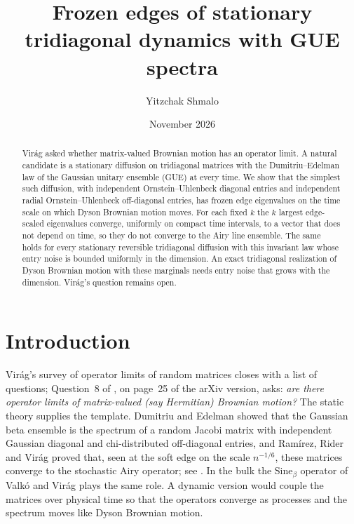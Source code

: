 \documentclass[11pt]{amsart}
\title[Frozen edges of tridiagonal GUE dynamics]{Frozen edges of stationary tridiagonal dynamics with GUE spectra}
\author{Yitzchak Shmalo}
\date{November 2026}
\theoremstyle{remark}
\begin{document}
\begin{abstract}
Vir\'ag asked whether matrix-valued Brownian motion has an operator limit. A natural candidate is a stationary
diffusion on tridiagonal matrices with the Dumitriu--Edelman law of the Gaussian unitary ensemble (GUE) at every time.
We show that the simplest such diffusion, with independent Ornstein--Uhlenbeck diagonal entries and independent radial
Ornstein--Uhlenbeck off-diagonal entries, has frozen edge eigenvalues on the time scale on which Dyson Brownian motion
moves. For each fixed $k$ the $k$ largest edge-scaled eigenvalues converge, uniformly on compact time intervals, to a
vector that does not depend on time, so they do not converge to the Airy line ensemble. The same holds for every
stationary reversible tridiagonal diffusion with this invariant law whose entry noise is bounded uniformly in the
dimension. An exact tridiagonal realization of Dyson Brownian motion with these marginals needs entry noise that grows
with the dimension. Vir\'ag's question remains open.
\end{abstract}
\maketitle

\section{Introduction}\label{sec:intro}

Vir\'ag's survey of operator limits of random matrices closes with a list of questions; Question~8 of
\cite{Vir14}, on page~25 of the arXiv version, asks: \emph{are there operator limits of matrix-valued (say Hermitian)
Brownian motion?} The static theory supplies the template. Dumitriu and Edelman \cite[Theorems~2.1 and~2.12]{DE02}
showed that the Gaussian beta ensemble is the spectrum of a random Jacobi matrix with independent Gaussian diagonal and
chi-distributed off-diagonal entries, and Ram\'irez, Rider and Vir\'ag \cite{RRV11} proved that, seen at the soft edge
on the scale $n^{-1/6}$, these matrices converge to the stochastic Airy operator; see \cite[Theorem~5.1]{Vir14}. In the
bulk the Sine$_\beta$ operator of Valk\'o and Vir\'ag \cite{VV17} plays the same role. A dynamic version would couple
the matrices over physical time so that the operators converge as processes and the spectrum moves like Dyson Brownian
motion.
\end{document}
